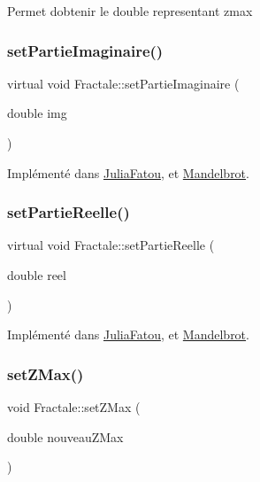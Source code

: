 Permet d\textquotesingle{}obtenir le double representant zmax \mbox{\label{classFractale_ab2dc26f50f2b0a3cbe986986075fe8f5}} 
\subsubsection{\texorpdfstring{set\+Partie\+Imaginaire()}{setPartieImaginaire()}}
{\footnotesize\ttfamily virtual void Fractale\+::set\+Partie\+Imaginaire (\begin{DoxyParamCaption}\item[{double}]{img }\end{DoxyParamCaption})\hspace{0.3cm}{\ttfamily [pure virtual]}}



Implémenté dans \hyperlink{classJuliaFatou_a99b8e79f86a6a189f861f8273b1a6405}{Julia\+Fatou}, et \hyperlink{classMandelbrot_a9649677b1faeff917202845fd697dbe6}{Mandelbrot}.

\mbox{\label{classFractale_a535969c022c88b7968784e160f41e1c3}} 
\subsubsection{\texorpdfstring{set\+Partie\+Reelle()}{setPartieReelle()}}
{\footnotesize\ttfamily virtual void Fractale\+::set\+Partie\+Reelle (\begin{DoxyParamCaption}\item[{double}]{reel }\end{DoxyParamCaption})\hspace{0.3cm}{\ttfamily [pure virtual]}}



Implémenté dans \hyperlink{classJuliaFatou_a5b89c7a96e48d5bdc0b044454fae0113}{Julia\+Fatou}, et \hyperlink{classMandelbrot_a419baeb8628191ee44f3c82dd3281017}{Mandelbrot}.

\mbox{\label{classFractale_a2db0021af26f76cf1c8fcac92d5c107a}} 
\subsubsection{\texorpdfstring{set\+Z\+Max()}{setZMax()}}
{\footnotesize\ttfamily void Fractale\+::set\+Z\+Max (\begin{DoxyParamCaption}\item[{double}]{nouveau\+Z\+Max }\end{DoxyParamCaption})}

